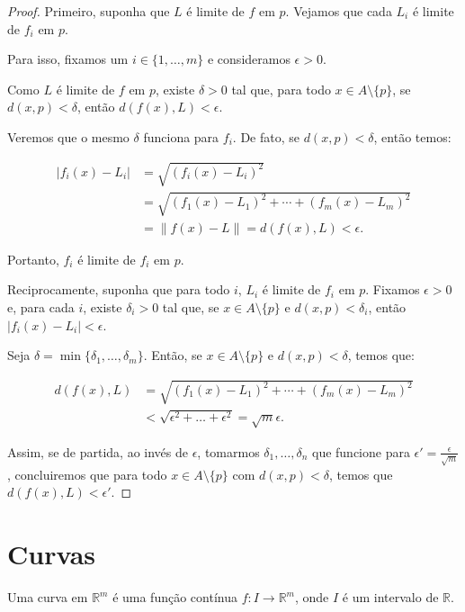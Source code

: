 \begin{proof}
    Primeiro, suponha que $L$ é limite de $f$ em $p$.
    Vejamos que cada $L_i$ é limite de $f_i$ em $p$.
    
    Para isso, fixamos um $i \in \{1, \dots, m\}$ e consideramos $\epsilon>0$.

    Como $L$ é limite de $f$ em $p$, existe $\delta>0$ tal que, para todo $x \in A\setminus\{p\}$, se $d(x, p) < \delta$, então $d(f(x), L) < \epsilon$.

    Veremos que o mesmo $\delta$ funciona para $f_i$.
    De fato, se $d(x, p) < \delta$, então temos:

    \begin{align*}
        |f_i(x) - L_i| &= \sqrt{(f_i(x) - L_i)^2} \\
        &= \sqrt{(f_1(x) - L_1)^2 + \cdots + (f_m(x) - L_m)^2} \\
        &= \|f(x) - L\| = d(f(x), L) < \epsilon.
    \end{align*}

    Portanto, $f_i$ é limite de $f_i$ em $p$.

    Reciprocamente, suponha que para todo $i$, $L_i$ é limite de $f_i$ em $p$.
    Fixamos $\epsilon>0$ e, para cada $i$, existe $\delta_i>0$ tal que, se $x \in A\setminus\{p\}$ e $d(x, p) < \delta_i$, então $|f_i(x) - L_i| < \epsilon$.

    Seja $\delta = \min\{\delta_1, \ldots, \delta_m\}$.
    Então, se $x \in A\setminus\{p\}$ e $d(x, p) < \delta$, temos que:

    \begin{align*}
        d(f(x), L) &= \sqrt{(f_1(x) - L_1)^2 + \cdots + (f_m(x) - L_m)^2} \\
        &< \sqrt{\epsilon^2+\dots+\epsilon^2}= \sqrt{m}\epsilon.
    \end{align*}

    Assim, se de partida, ao invés de $\epsilon$, tomarmos $\delta_1, \dots, \delta_n$ que funcione para $\epsilon'=\frac{\epsilon}{\sqrt{m}}$, concluiremos que para todo $x \in A\setminus\{p\}$ com $d(x, p) < \delta$, temos que $d(f(x), L) < \epsilon'$.
\end{proof}

\section{Curvas}
\begin{definition}
Uma curva em $\mathbb R^m$ é uma função contínua $f: I\rightarrow \mathbb R^m$, onde $I$ é um intervalo de $\mathbb R$.
\end{definition}